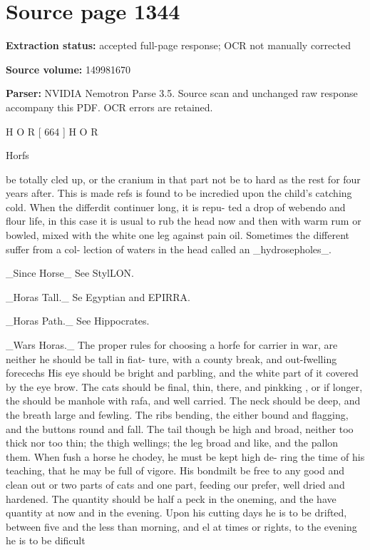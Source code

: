 \clearpage
\section{Source page 1344}
\textbf{Extraction status:} accepted full-page response; OCR not manually corrected\par
\textbf{Source volume:} 149981670\par
\textbf{Parser:} NVIDIA Nemotron Parse 3.5. Source scan and unchanged raw response accompany this PDF. OCR errors are retained.\par\medskip
H O R [ 664 ] H O R\par\medskip
Horfs\par\medskip
be totally cled up, or the cranium in that part not be
to hard as the rest for four years after. This is made
refs is found to be incredied upon the child’s catching
cold. When the differdit continuer long, it is repu-
ted a drop of webendo and flour life, in this case
it is usual to rub the head now and then with warm
rum or bowled, mixed with the white one leg against
pain oil. Sometimes the different suffer from a col-
lection of waters in the head called an \_hydrosepholes\_.\par\medskip
\_Since Horse\_ See StylLON.\par\medskip
\_Horas Tall.\_ Se Egyptian and EPIRRA.\par\medskip
\_Horas Path.\_ See Hippocrates.\par\medskip
\_Wars Horas.\_ The proper rules for choosing a horfe
for carrier in war, are neither he should be tall in fiat-
ture, with a county break, and out-fwelling forecechs
His eye should be bright and parbling, and the white
part of it covered by the eye brow. The cats should
be final, thin, there, and pinkking , or if longer, the
should be manhole with rafa, and well carried. The
neck should be deep, and the breath large and fewling.
The ribs bending, the either bound and flagging, and
the buttons round and fall. The tail though be high
and broad, neither too thick nor too thin; the thigh
wellings; the leg broad and like, and the pallon them.
When fush a horse he chodey, he must be kept high de-
ring the time of his teaching, that he may be full of
vigore. His bondmilt be free to any good and clean out
or two parts of cats and one part, feeding our prefer,
well dried and hardened. The quantity should be half
a peck in the oneming, and the have quantity at now
and in the evening. Upon his cutting days he is to be
drifted, between five and the less than morning, and
el at times or rights, to the evening he is to be dificult
